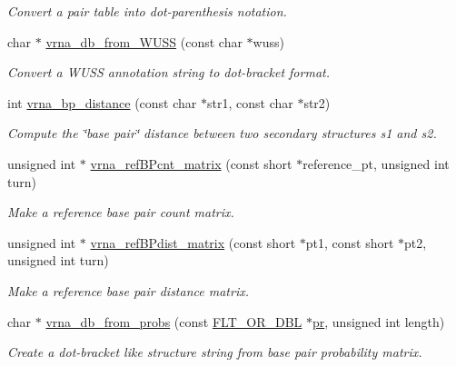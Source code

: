 \begin{DoxyCompactItemize}
\begin{DoxyCompactList}\small\item\em Convert a pair table into dot-\/parenthesis notation. \end{DoxyCompactList}\item 
char $\ast$ \hyperlink{group__struct__utils_ga02ca70cffb2d864f7b2d95d92218bae0}{vrna\+\_\+db\+\_\+from\+\_\+\+W\+U\+SS} (const char $\ast$wuss)
\begin{DoxyCompactList}\small\item\em Convert a W\+U\+SS annotation string to dot-\/bracket format. \end{DoxyCompactList}\item 
int \hyperlink{group__struct__utils_ga65bdfbac6a16bf30286e8a3f7d15f60a}{vrna\+\_\+bp\+\_\+distance} (const char $\ast$str1, const char $\ast$str2)
\begin{DoxyCompactList}\small\item\em Compute the \char`\"{}base pair\char`\"{} distance between two secondary structures s1 and s2. \end{DoxyCompactList}\item 
unsigned int $\ast$ \hyperlink{group__struct__utils_gab4c2a00c99ce1d612ffa5bde114eb96d}{vrna\+\_\+ref\+B\+Pcnt\+\_\+matrix} (const short $\ast$reference\+\_\+pt, unsigned int turn)
\begin{DoxyCompactList}\small\item\em Make a reference base pair count matrix. \end{DoxyCompactList}\item 
unsigned int $\ast$ \hyperlink{group__struct__utils_ga5a27bd058183170afd4716f5b8ff511a}{vrna\+\_\+ref\+B\+Pdist\+\_\+matrix} (const short $\ast$pt1, const short $\ast$pt2, unsigned int turn)
\begin{DoxyCompactList}\small\item\em Make a reference base pair distance matrix. \end{DoxyCompactList}\item 
\mbox{\label{group__struct__utils_ga0c28c410a5ab22d6ab9c77a84e8d5b44}} 
char $\ast$ \hyperlink{group__struct__utils_ga0c28c410a5ab22d6ab9c77a84e8d5b44}{vrna\+\_\+db\+\_\+from\+\_\+probs} (const \hyperlink{group__data__structures_ga31125aeace516926bf7f251f759b6126}{F\+L\+T\+\_\+\+O\+R\+\_\+\+D\+BL} $\ast$\hyperlink{fold__vars_8h_ac98ec419070aee6831b44e5c700f090f}{pr}, unsigned int length)
\begin{DoxyCompactList}\small\item\em Create a dot-\/bracket like structure string from base pair probability matrix. \end{DoxyCompactList}\item 

\end{DoxyCompactItemize}
